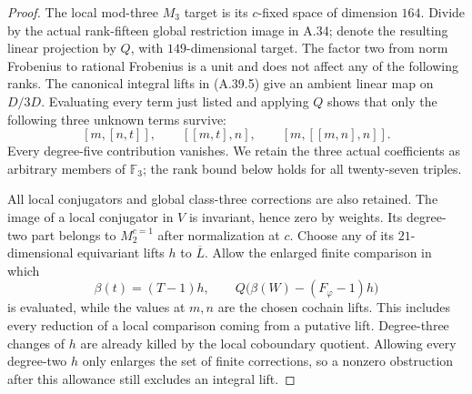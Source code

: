 \begin{proof}
The local mod-three $M_3$ target is its $c$-fixed space of
dimension $164$. Divide by the actual rank-fifteen global
restriction image in A.34; denote the resulting linear
projection by $Q$, with $149$-dimensional target. The factor
two from norm Frobenius to rational Frobenius is a unit and
does not affect any of the following ranks. The canonical
integral lifts in (A.39.5) give an ambient linear map on
$D/3D$. Evaluating every term just listed and applying $Q$
shows that only the following three unknown terms survive:
\[
 [m,[n,t]],\qquad [[m,t],n],\qquad [m,[[m,n],n]].
 \tag{A.39.11}
\]
Every degree-five contribution vanishes. We retain the three
actual coefficients as arbitrary members of $\mathbb F_3$;
the rank bound below holds for all twenty-seven triples.

All local conjugators and global class-three corrections are
also retained. The image of a local conjugator in $V$ is
invariant, hence zero by weights. Its degree-two part belongs
to $M_2^{c=1}$ after normalization at $c$. Choose any of its
$21$-dimensional equivariant lifts $h$ to $\overline L$.
Allow the enlarged finite comparison in which
\[
 \beta(t)=(T-1)h,\qquad
 Q\bigl(\beta(W)-(F_\varphi-1)h\bigr)
 \tag{A.39.12}
\]
is evaluated, while the values at $m,n$ are the chosen
cochain lifts. This includes every reduction of a local
comparison coming from a putative lift. Degree-three changes
of $h$ are already killed by the local coboundary quotient.
Allowing every degree-two $h$ only enlarges the set of finite
corrections, so a nonzero obstruction after this allowance
still excludes an integral lift.


\end{proof}
